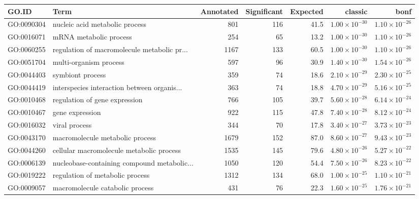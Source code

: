 \begin{table}[ht]
\centering
\begin{adjustbox}{max width=\textwidth}
\begin{tabular}{llrrrrr}
  \hline
GO.ID & Term & Annotated & Significant & Expected & classic & bonf \\ 
  \hline
GO:0090304 & nucleic acid metabolic process & 801 & 116 & 41.5 & $1.00 \times 10^{-30}$ & $1.10 \times 10^{-26}$ \\ 
  GO:0016071 & mRNA metabolic process & 254 & 65 & 13.2 & $1.00 \times 10^{-30}$ & $1.10 \times 10^{-26}$ \\ 
  GO:0060255 & regulation of macromolecule metabolic pr... & 1167 & 133 & 60.5 & $1.00 \times 10^{-30}$ & $1.10 \times 10^{-26}$ \\ 
  GO:0051704 & multi-organism process & 597 & 96 & 30.9 & $1.40 \times 10^{-30}$ & $1.54 \times 10^{-26}$ \\ 
  GO:0044403 & symbiont process & 359 & 74 & 18.6 & $2.10 \times 10^{-29}$ & $2.30 \times 10^{-25}$ \\ 
  GO:0044419 & interspecies interaction between organis... & 363 & 74 & 18.8 & $4.70 \times 10^{-29}$ & $5.16 \times 10^{-25}$ \\ 
  GO:0010468 & regulation of gene expression & 766 & 105 & 39.7 & $5.60 \times 10^{-28}$ & $6.14 \times 10^{-24}$ \\ 
  GO:0010467 & gene expression & 922 & 115 & 47.8 & $7.40 \times 10^{-28}$ & $8.12 \times 10^{-24}$ \\ 
  GO:0016032 & viral process & 344 & 70 & 17.8 & $3.40 \times 10^{-27}$ & $3.73 \times 10^{-23}$ \\ 
  GO:0043170 & macromolecule metabolic process & 1679 & 152 & 87.0 & $8.60 \times 10^{-27}$ & $9.43 \times 10^{-23}$ \\ 
  GO:0044260 & cellular macromolecule metabolic process & 1535 & 145 & 79.6 & $4.80 \times 10^{-26}$ & $5.27 \times 10^{-22}$ \\ 
  GO:0006139 & nucleobase-containing compound metabolic... & 1050 & 120 & 54.4 & $7.50 \times 10^{-26}$ & $8.23 \times 10^{-22}$ \\ 
  GO:0019222 & regulation of metabolic process & 1312 & 134 & 68.0 & $1.00 \times 10^{-25}$ & $1.10 \times 10^{-21}$ \\ 
  GO:0009057 & macromolecule catabolic process & 431 & 76 & 22.3 & $1.60 \times 10^{-25}$ & $1.76 \times 10^{-21}$ \\ 

\end{tabular}
\end{adjustbox}
\end{table}
